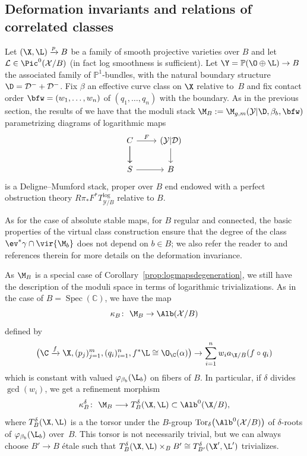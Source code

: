\subsection{Deformation invariants and relations of correlated classes}
Let $(\X,\L)\xrightarrow{p} B$ be a family of smooth projective varieties over $B$ and let $\mathcal L\in \Pic^0(\mathcal X\slash B)$ (in fact log smoothness is sufficient).
Let $\Y=\mathbb P(\O\oplus\L)\to B$ the associated family of $\mathbb P^1$-bundles, with the natural boundary structure $\D=\mathcal D^- +\mathcal D^-$.
Fix $\beta$ an effective curve class on $\X$ relative to~$B$ and
fix contact order $\bfw=(w_1,\dots,w_n)$ of $(q_1,\dots,q_n)$ with the boundary.
As in the previous section, the results of \cite{abramovich2014stable,gross2013logarithmic,maulik2023logarithmic} we have that the moduli stack
$\M_B:=\M_{g, m}(\mathcal Y|\D,\beta_b, \bfw)$
parametrizing diagrams of logarithmic maps
\[
\begin{tikzcd}
C\ar[r,"F"]\ar[d]\ar[d] & (\mathcal Y|\mathcal{D})\ar[d]\\
S\ar[r] & B
\end{tikzcd}
\]
is a Deligne--Mumford stack, proper over $B$ end endowed with a perfect obstruction theory $R\pi_*F^*T^{\log}_{\mathcal Y\slash B}$ relative to $B$.

As for the case of absolute stable maps,
for $B$ regular and connected, the basic properties of the virtual class construction \cite{behrend1997intrinsic,manolache2012virtual} ensure that
the degree of the class $\ev^*\gamma\cap\vir{\M_b}$ does not depend on $b\in B$; we also refer the reader to \cite[Appendix~A]{mandel2020descendant} and references therein for more details on the deformation invariance.

As $\M_B$ is a special case of Corollary~\ref{prop:logmapsdegeneration}, we still have the description of the moduli space in terms of logarithmic trivializations. As in the case of $B=\operatorname{Spec}(\mathbb C)$, we have the map
\[\kappa_B\colon\ \M_B\to\Alb(\mathcal X\slash B)\]
defined by
\[\bigl(\C\xrightarrow{f}\X,(p_j)_{j=1}^m,(q_i)_{i=1}^n,f^*\L\cong\O_{\C}(\alpha)\bigr)\rightarrow \sum_{i=1}^n w_i a_{\X\slash B}(f\circ q_i)\]
which is constant with valued $\varphi_{\beta_b}(\L_b)$ on fibers of $B$. In particular, if $\delta$ divides $\gcd(w_i)$, we get a refinement morphism
\[\kappa^\delta_B\colon\ \M_B\longrightarrow T^\delta_B(\X,\L)\subset \Alb^0(\X/B),
\]
where $T^\delta_B(\X,\L)$ is a the torsor under the $B$-group $\operatorname{Tor}_{\delta}\bigl(\Alb^0(\mathcal X\slash B)\bigr)$ of $\delta$-roots of $\varphi_{\beta_b}(\L_b)$ over~$B$. This torsor is not necessarily trivial, but we can always choose $B'\to B$ \'etale such that $T^\delta_B(\X,\L)\times_B B'\cong T^\delta_{B'}(\X',\L')$ trivializes.


